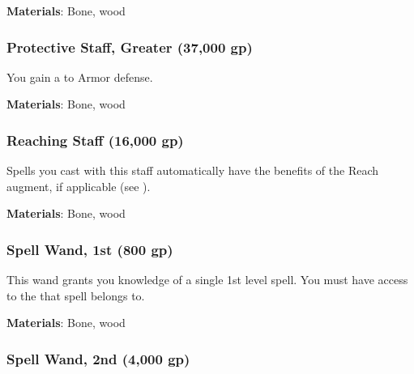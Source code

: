 \vspace{0.25em}
\textbf{Materials}: Bone, wood


\lowercase{\hypertarget{item:Protective Staff, Greater}{}}\label{item:Protective Staff, Greater}
\hypertarget{item:Protective Staff, Greater}{\subsubsection{Protective Staff, Greater\hfill{} (37,000 gp)}}

You gain a   to Armor defense.



\vspace{0.25em}
\textbf{Materials}: Bone, wood


\lowercase{\hypertarget{item:Reaching Staff}{}}\label{item:Reaching Staff}
\hypertarget{item:Reaching Staff}{\subsubsection{Reaching Staff\hfill{} (16,000 gp)}}

Spells you cast with this staff automatically have the benefits of the Reach augment, if applicable (see ).



\vspace{0.25em}
\textbf{Materials}: Bone, wood


\lowercase{\hypertarget{item:Spell Wand, 1st}{}}\label{item:Spell Wand, 1st}
\hypertarget{item:Spell Wand, 1st}{\subsubsection{Spell Wand, 1st\hfill{} (800 gp)}}

This wand grants you knowledge of a single 1st level spell.
You must have access to the  that spell belongs to.



\vspace{0.25em}
\textbf{Materials}: Bone, wood


\lowercase{\hypertarget{item:Spell Wand, 2nd}{}}\label{item:Spell Wand, 2nd}
\hypertarget{item:Spell Wand, 2nd}{\subsubsection{Spell Wand, 2nd\hfill{} (4,000 gp)}}

